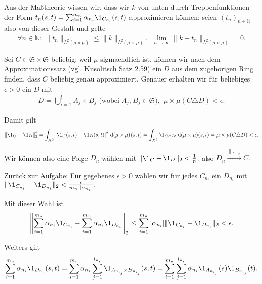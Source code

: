 \begin{solution}
\begin{enumerate}[label = (\alph*)]
Aus der Maßtheorie wissen wir, dass wir $k$ von unten durch Treppenfunktionen der Form $t_n(s,t) = \sum_{i=1}^{m_n} \alpha_{n_i} \1_{C_{n_i}}(s,t)$ approximieren können; seien $(t_n)_{n \in \mathbb{N}}$ also von dieser Gestalt und gelte
\begin{align}
    \forall n \in \mathbb{N}:~ \|t_n\|_{L^2(\mu\times\mu)} \leq \|k\|_{L^2(\mu\times\mu)}, ~~\lim\limits_{n \rightarrow \infty}{\|k-t_n\|_{L^2(\mu\times\mu)}} = 0.
\end{align}

Sei $C \in \mathfrak{S} \times \mathfrak{S}$ beliebig; weil $\mu$ sigmaendlich ist, können wir nach dem Approximationssatz (vgl. Kusolitsch Satz 2.59) ein $D$ aus dem zugehörigen Ring finden, dass $C$ beliebig genau approximiert. Genauer erhalten wir für beliebiges $\epsilon > 0$ ein $D$ mit
\begin{align}
    D = \bigcup_{i=1}^{l} A_j \times B_j \text{~(wobei~} A_j, B_j \in \mathfrak{S}), ~~\mu\times\mu(C \triangle D) < \epsilon.
\end{align}

Damit gilt
\begin{align}
    \|\1_C - \1_D\|_2^2 = \int_{X^2} |\1_C(s,t) - \1_D(s,t)|^2 ~\mathrm{d}(\mu\times\mu)(s,t) = \int_{X^2} \1_{C \triangle D}~\mathrm{d}(\mu\times\mu)(s,t) = \mu\times\mu(C \triangle D) < \epsilon.
\end{align}

Wir können also eine Folge $D_n$ wählen mit $\|\1_C - \1_D\|_2 < \frac{1}{n},$ also $D_n \xrightarrow{\|.\|_2} C.$

Zurück zur Aufgabe: Für gegebenes $\epsilon > 0$ wählen wir für jedes $C_{n_i}$ ein $D_{n_i}$ mit $\|\1_{C_{n_i}} - \1_{D_{n_i}}\|_2 < \frac{\epsilon}{m_n ~|\alpha_{n_i}|}.$

Mit dieser Wahl ist
\begin{align}
    \left\| \sum_{i=1}^{m_n} \alpha_{n_i} \1_{C_{n_i}} - \sum_{i=1}^{m_n} \alpha_{n_i} \1_{D_{n_i}}\right\|_2
    \leq \sum_{i=1}^{m_n} |\alpha_{n_i}| \|\1_{C_{n_i}} - \1_{D_{n_i}} \|_2 < \epsilon.
\end{align}

Weiters gilt
\begin{align}
    \sum_{i=1}^{m_n} \alpha_{n_i} \1_{D_{n_i}}(s,t)
    = \sum_{i=1}^{m_n} \alpha_{n_i} \sum_{j=1}^{l_{n_i}}  \1_{A_{n_{i_j}} \times B_{n_{i_j}}}(s,t)
    = \sum_{i=1}^{m_n} \sum_{j=1}^{l_{n_i}}   \alpha_{n_i} \1_{A_{n_{i_j}}}(s) \1_{B_{n_{i_j}}}(t).
\end{align}


\end{enumerate}
\end{solution}
